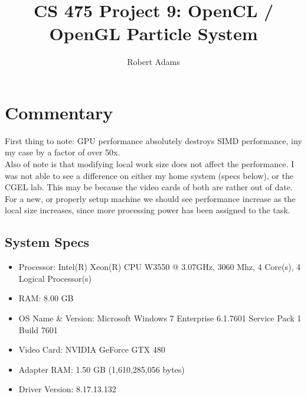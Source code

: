 \documentclass[letterpaper,10pt]{article} %
\begin{document}
\title{CS 475 Project 9: OpenCL / OpenGL Particle System}
\author{Robert Adams}
\maketitle



\section{Commentary}

\indent First thing to note: GPU performance absolutely destroys SIMD performance,
iny my case by a factor of over 50x. 
\\
Also of note is that modifying local work size does not affect the 
performance. I was not able to see a difference on either my home 
system (specs below), or the CGEL lab. This may be because the video
cards of both are rather out of date.  For a new, or properly setup
machine we should see performance increase as the local size increases,
since more processing power has been assigned to the task.

\subsection{System Specs}

\begin{itemize}
\item Processor: Intel(R) Xeon(R) CPU   W3550  @ 3.07GHz, 3060 Mhz, 4 Core(s), 4 Logical Processor(s)
\item RAM: 8.00 GB
\item OS Name \& Version: Microsoft Windows 7 Enterprise 6.1.7601 Service Pack 1 Build 7601
\item Video Card: NVIDIA GeForce GTX 480 
\item Adapter RAM: 1.50 GB (1,610,285,056 bytes) 
\item Driver Version: 8.17.13.132
\end{itemize}


\pagebreak

\begin{figure} [ht]
	\centering
	
	\label{runtimes}
\end{figure}
\end{document}
